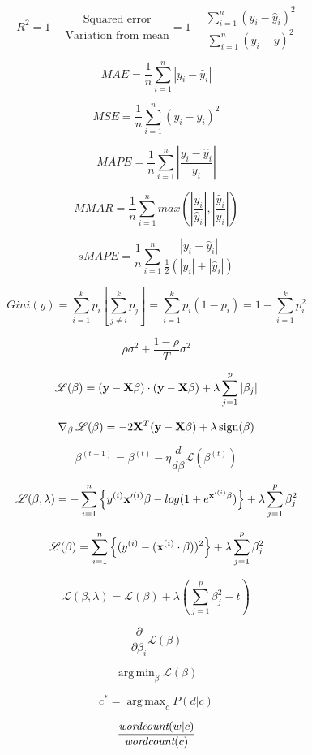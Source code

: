 \documentclass[11pt]{article}
\DeclareMathOperator*{\argmax}{arg\,max}
\DeclareMathOperator*{\argmin}{arg\,min}
\begin{document}
\[
R^2 = 1 - \frac{\text{Squared error}}{\text{Variation from mean}} = 1 - \frac{\sum_{i=1}^{n} (y_i - \hat{y}_i)^2}{\sum_{i=1}^{n} (y_i - \overline{y})^2}
\]

\[
MAE = \frac{1}{n} \sum_{i=1}^{n} |y_i - \hat{y}_i|
\]

\[
MSE = \frac{1}{n} \sum_{i=1}^{n} \left(y_i - \hat{y}_i\right)^2
\]

\[
MAPE = \frac{1}{n} \sum_{i=1}^{n} \left|\frac{y_i - \hat{y}_i}{y_i}\right|
\]


\[
MMAR = \frac{1}{n} \sum_{i=1}^{n} max(\left|\frac{y_i}{\hat{y}_i}\right|,\left|\frac{\hat{y}_i}{y_i}\right|)
\]

\[
sMAPE = \frac{1}{n} \sum_{i=1}^{n} \frac{|y_i - \hat{y}_i|}{\frac{1}{2}(|y_i|+|\hat{y}_i|)}
\]

$$
Gini(y) = \sum_{i=1}^{k} p_i \left[ \sum_{j \ne i}^k p_j \right] = \sum_{i=1}^{k} p_i (1 - p_i) = 1 - \sum_{i=1}^{k} p_i^2
$$

$$
\rho \sigma^2  + \frac{1-\rho}{T}\sigma^2
$$

$$
{\mathscr L}(\beta) = ({\bf y} - {\bf X} \beta) \cdot ({\bf y} - {\bf X} \beta) + \lambda \sum_{j=1}^{p}|\beta_j|
$$

$$
\nabla_{\beta}\, {\mathscr L}(\beta) = -2{\bf X}^T ({\bf y} - {\bf X} \beta) + \lambda \,\text{sign}(\beta)
$$


$$
\beta^{(t+1)} = \beta^{(t)} - \eta \frac{d}{d \beta} {\mathscr L}(\beta^{(t)})
$$

$$
{\mathscr L}(\beta,\lambda) = - \sum_{i=1}^n \left \{ y^{(i)}{\bf x}'^{(i)}\beta - log(1+e^{{\bf x}'^{(i)}\beta}) \right \} + \lambda \sum_{j=1}^{p}  \beta_j^2
$$


$$
{\mathscr L}(\beta) =  \sum_{i=1}^n \left \{ (y^{(i)} - ({\bf x}^{(i)} \cdot \beta))^2 \right \} + \lambda \sum_{j=1}^{p}  \beta_j^2
$$

$$
{\mathscr L}(\beta, \lambda) = {\mathscr L}(\beta) + \lambda (\sum_{j=1}^{p}  \beta_j^2 - t)
$$

$$
\frac{\partial}{\partial \beta_i} {\mathscr L}(\beta)
$$

$$
\argmin_{\beta} {\mathscr L}(\beta)
$$

$$
c^* = \argmax_{c}  P(d|c)
$$

$$
\frac{\text{\it wordcount}(w|c)}{\text{\it wordcount}(c)}
$$
 
\end{document}
